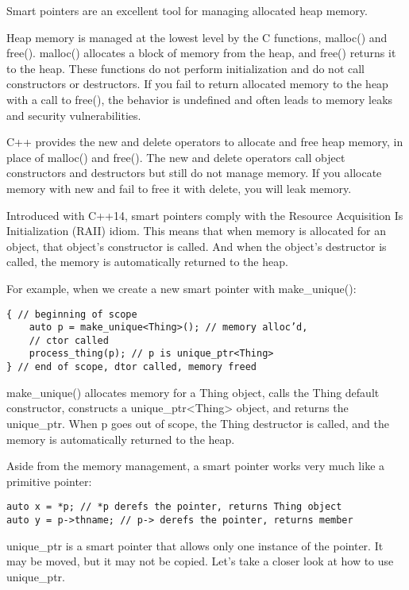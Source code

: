 
Smart pointers are an excellent tool for managing allocated heap memory.

Heap memory is managed at the lowest level by the C functions, malloc() and free(). malloc() allocates a block of memory from the heap, and free() returns it to the heap. These functions do not perform initialization and do not call constructors or destructors. If you fail to return allocated memory to the heap with a call to free(), the behavior is undefined and often leads to memory leaks and security vulnerabilities.

C++ provides the new and delete operators to allocate and free heap memory, in place of malloc() and free(). The new and delete operators call object constructors and destructors but still do not manage memory. If you allocate memory with new and fail to free it with delete, you will leak memory.

Introduced with C++14, smart pointers comply with the Resource Acquisition Is Initialization (RAII) idiom. This means that when memory is allocated for an object, that object's constructor is called. And when the object's destructor is called, the memory is automatically returned to the heap.

For example, when we create a new smart pointer with make\_unique():

\begin{lstlisting}[style=styleCXX]
{ // beginning of scope
	auto p = make_unique<Thing>(); // memory alloc’d,
	// ctor called
	process_thing(p); // p is unique_ptr<Thing>
} // end of scope, dtor called, memory freed
\end{lstlisting}

make\_unique() allocates memory for a Thing object, calls the Thing default constructor, constructs a unique\_ptr<Thing> object, and returns the unique\_ptr. When p goes out of scope, the Thing destructor is called, and the memory is automatically returned to the heap.

Aside from the memory management, a smart pointer works very much like a primitive pointer:

\begin{lstlisting}[style=styleCXX]
auto x = *p; // *p derefs the pointer, returns Thing object
auto y = p->thname; // p-> derefs the pointer, returns member
\end{lstlisting}

unique\_ptr is a smart pointer that allows only one instance of the pointer. It may be moved, but it may not be copied. Let's take a closer look at how to use unique\_ptr.

